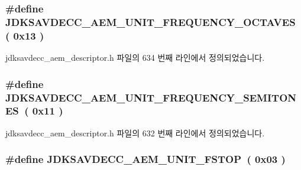 \subsubsection[{\texorpdfstring{J\+D\+K\+S\+A\+V\+D\+E\+C\+C\+\_\+\+A\+E\+M\+\_\+\+U\+N\+I\+T\+\_\+\+F\+R\+E\+Q\+U\+E\+N\+C\+Y\+\_\+\+O\+C\+T\+A\+V\+ES}{JDKSAVDECC_AEM_UNIT_FREQUENCY_OCTAVES}}]{\setlength{\rightskip}{0pt plus 5cm}\#define J\+D\+K\+S\+A\+V\+D\+E\+C\+C\+\_\+\+A\+E\+M\+\_\+\+U\+N\+I\+T\+\_\+\+F\+R\+E\+Q\+U\+E\+N\+C\+Y\+\_\+\+O\+C\+T\+A\+V\+ES~( 0x13 )}\hypertarget{group__units_ga54988b1f7a354b61a5438885b958e69e}{}\label{group__units_ga54988b1f7a354b61a5438885b958e69e}


jdksavdecc\+\_\+aem\+\_\+descriptor.\+h 파일의 634 번째 라인에서 정의되었습니다.

\subsubsection[{\texorpdfstring{J\+D\+K\+S\+A\+V\+D\+E\+C\+C\+\_\+\+A\+E\+M\+\_\+\+U\+N\+I\+T\+\_\+\+F\+R\+E\+Q\+U\+E\+N\+C\+Y\+\_\+\+S\+E\+M\+I\+T\+O\+N\+ES}{JDKSAVDECC_AEM_UNIT_FREQUENCY_SEMITONES}}]{\setlength{\rightskip}{0pt plus 5cm}\#define J\+D\+K\+S\+A\+V\+D\+E\+C\+C\+\_\+\+A\+E\+M\+\_\+\+U\+N\+I\+T\+\_\+\+F\+R\+E\+Q\+U\+E\+N\+C\+Y\+\_\+\+S\+E\+M\+I\+T\+O\+N\+ES~( 0x11 )}\hypertarget{group__units_ga921aeeb3769079ccc598a5b6702c6fa5}{}\label{group__units_ga921aeeb3769079ccc598a5b6702c6fa5}


jdksavdecc\+\_\+aem\+\_\+descriptor.\+h 파일의 632 번째 라인에서 정의되었습니다.

\subsubsection[{\texorpdfstring{J\+D\+K\+S\+A\+V\+D\+E\+C\+C\+\_\+\+A\+E\+M\+\_\+\+U\+N\+I\+T\+\_\+\+F\+S\+T\+OP}{JDKSAVDECC_AEM_UNIT_FSTOP}}]{\setlength{\rightskip}{0pt plus 5cm}\#define J\+D\+K\+S\+A\+V\+D\+E\+C\+C\+\_\+\+A\+E\+M\+\_\+\+U\+N\+I\+T\+\_\+\+F\+S\+T\+OP~( 0x03 )}\hypertarget{group__units_gae5b5707d79134c1e4084642c69e463db}{}\label{group__units_gae5b5707d79134c1e4084642c69e463db}


